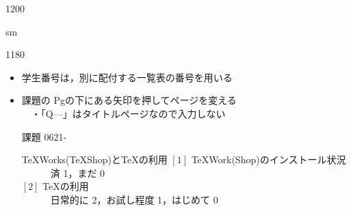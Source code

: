 \documentclass[landscape,10pt]{ujarticle}
\newcommand{\slidepage}[1][s]{%
\setcounter{ketpicctra}{18}%
\if#1m \setcounter{ketpicctra}{1}\fi
\hypersetup{linkcolor=black}%

\begin{layer}{118}{0}
\putnotee{122}{-\theketpicctra.05}{\small\thepage/\pageref{pageend}}
\end{layer}\hypersetup{linkcolor=blue}

}
\newcommand{\hiduke}{0621}
\begin{document}
\begin{layer}{120}{0}
\end{layer}

\def\mainslidetitley{22}
\def\ketcletter{slidecolora}
\def\ketcbox{slidecolorb}
\def\ketdbox{slidecolorc}
\def\ketcframe{slidecolord}
\def\ketcshadow{slidecolore}
\def\ketdshadow{slidecolorf}
\def\slidetitlex{6}
\def\slidetitlesize{1.3}
\def\mketcletter{slidecolori}
\def\mketcbox{yellow}
\def\mketdbox{yellow}
\def\mketcframe{yellow}
\def\mslidetitlex{62}
\def\mslidetitlesize{2}

\color{black}
\Large\bf\boldmath
\addtocounter{page}{-1}

\def\MARU{}
\renewcommand{\MARU}[1]{{\ooalign{\hfil$#1$\/\hfil\crcr\raise.167ex\hbox{\mathhexbox20D}}}}
\renewcommand{\slidepage}[1][s]{%
\setcounter{ketpicctra}{18}%
\if#1m \setcounter{ketpicctra}{1}\fi
\hypersetup{linkcolor=black}%
\begin{layer}{118}{0}
\putnotee{115}{-\theketpicctra.05}{\small\hiduke-\thepage/\pageref{pageend}}
\end{layer}\hypersetup{linkcolor=blue}
}
\setcounter{ban}{1}
\newcommand{\monban}[1][\hiduke]{%
#1-\theban\ %
\addtocounter{ban}{1}%
}
\newcommand{\monbannoadd}[1][\hiduke]{%
#1-\theban\ %
}
\newcommand{\addban}{%
\addtocounter{ban}{1}%
}
\newcommand{\seteda}[1]{
\setcounter{edawidth}{#1}
\setcounter{edactr}{1}
}
\newcommand{\eda}[2][\theedawidth ]{%
\noindent\Ltab{#1 mm}{[\theedactr]\ #2}%
\addtocounter{edactr}{1}%
}



\vspace*{18mm}

\slidepage
\begin{itemize}
\item
学生番号は，別に配付する一覧表の番号を用いる
\item
課題の Pgの下にある矢印を押してページを変える\\
　・{\color{red}「Q---」はタイトルページなので入力しない}
\item
[課題]\monban TeXWorks(TeXShop)とTeXの利用
$[1]$ TeXWork(Shop)のインストール状況\\
　　　済 1，まだ 0\\
$[2]$ TeXの利用\\
　　　日常的に 2，お試し程度  1，はじめて  0\\
\end{itemize}
\end{document}
